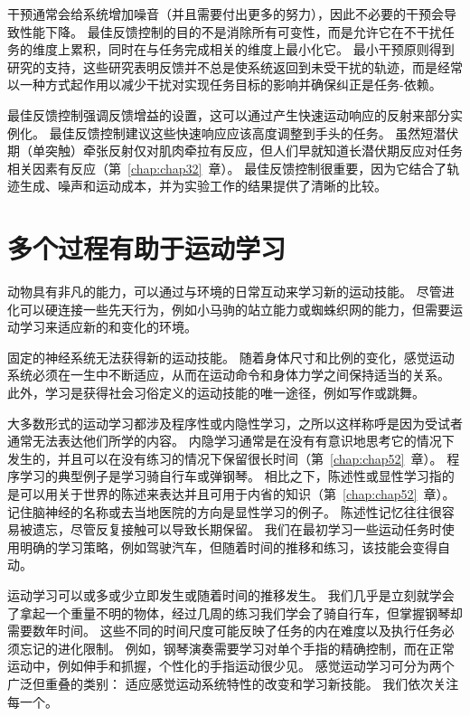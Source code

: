 干预通常会给系统增加噪音（并且需要付出更多的努力），因此不必要的干预会导致性能下降。
最佳反馈控制的目的不是消除所有可变性，而是允许它在不干扰任务的维度上累积，同时在与任务完成相关的维度上最小化它。
最小干预原则得到研究的支持，这些研究表明反馈并不总是使系统返回到未受干扰的轨迹，而是经常以一种方式起作用以减少干扰对实现任务目标的影响并确保纠正是任务-依赖。


最佳反馈控制强调反馈增益的设置，这可以通过产生快速运动响应的反射来部分实例化。
最佳反馈控制建议这些快速响应应该高度调整到手头的任务。
虽然短潜伏期（单突触）牵张反射仅对肌肉牵拉有反应，但人们早就知道长潜伏期反应对任务相关因素有反应（第~\ref{chap:chap32}~章）。
最佳反馈控制很重要，因为它结合了轨迹生成、噪声和运动成本，并为实验工作的结果提供了清晰的比较。



\section{多个过程有助于运动学习}

动物具有非凡的能力，可以通过与环境的日常互动来学习新的运动技能。
尽管进化可以硬连接一些先天行为，例如小马驹的站立能力或蜘蛛织网的能力，但需要运动学习来适应新的和变化的环境。


固定的神经系统无法获得新的运动技能。
随着身体尺寸和比例的变化，感觉运动系统必须在一生中不断适应，从而在运动命令和身体力学之间保持适当的关系。
此外，学习是获得社会习俗定义的运动技能的唯一途径，例如写作或跳舞。


大多数形式的运动学习都涉及程序性或内隐性学习，之所以这样称呼是因为受试者通常无法表达他们所学的内容。
内隐学习通常是在没有有意识地思考它的情况下发生的，并且可以在没有练习的情况下保留很长时间（第~\ref{chap:chap52}~章）。
程序学习的典型例子是学习骑自行车或弹钢琴。 相比之下，陈述性或显性学习指的是可以用关于世界的陈述来表达并且可用于内省的知识（第~\ref{chap:chap52}~章）。
记住脑神经的名称或去当地医院的方向是显性学习的例子。
陈述性记忆往往很容易被遗忘，尽管反复接触可以导致长期保留。
我们在最初学习一些运动任务时使用明确的学习策略，例如驾驶汽车，但随着时间的推移和练习，该技能会变得自动。


运动学习可以或多或少立即发生或随着时间的推移发生。
我们几乎是立刻就学会了拿起一个重量不明的物体，经过几周的练习我们学会了骑自行车，但掌握钢琴却需要数年时间。
这些不同的时间尺度可能反映了任务的内在难度以及执行任务必须忘记的进化限制。
例如，钢琴演奏需要学习对单个手指的精确控制，而在正常运动中，例如伸手和抓握，个性化的手指运动很少见。
感觉运动学习可分为两个广泛但重叠的类别：
适应感觉运动系统特性的改变和学习新技能。
我们依次关注每一个。



